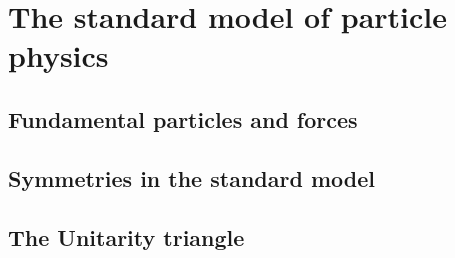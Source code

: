 \chapter{The standard model of particle physics}

\blindtext

\section{Fundamental particles and forces}

\Blindtext

\section{Symmetries in the standard model}

\Blindtext

\section{The Unitarity triangle}

\Blindtext

